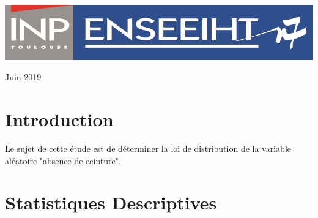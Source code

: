 \documentclass[a4paper,oneside]{article}
\begin{document}
\begin{titlepage}
	\vfill %


	\includegraphics[scale=0.8]{logoN7.png} %

	\vspace{0.3\baselineskip} %

Juin 2019 %
\end{titlepage}
\newpage


\section{Introduction}

Le sujet de cette étude est de déterminer la loi de distribution de la variable aléatoire "absence de ceinture".
\section{Statistiques Descriptives}
\end{document}
